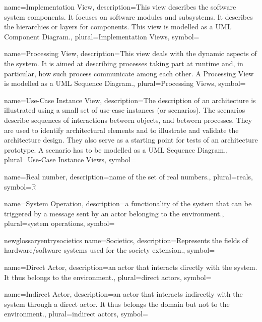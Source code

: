 {name={Implementation View},
description={This view describes the software system components. It focuses on
software modules and subsystems. It describes the hierarchies or layers for
components. This view is modelled as a UML Component Diagram.},
plural={Implementation Views}, 
symbol={}
}


{name={Processing View},
description={This view deals with the dynamic aspects of the system. It is
aimed at describing processes taking part at runtime and, in particular, how
such process communicate among each other. A Processing View is modelled as a
UML Sequence Diagram.},
plural={Processing Views}, 
symbol={}
}


{name={Use-Case Instance View},
description={The description of an architecture is illustrated using a small set
of use-case instances (or scenarios). The scenarios describe sequences of
interactions between objects, and between processes. They are used to identify
architectural elements and to illustrate and validate the architecture design.
They also serve as a starting point for tests of an architecture prototype. A
scenario has to be modelled as a UML Sequence Diagram.}, 
plural={Use-Case Instance Views}, 
symbol={}
}

{name={Real number},
description={name of the set of real numbers.},
plural={reals},
symbol={\ensuremath{\mathbb{R}}}
}

{name={System Operation},
description={a functionality of the system that can be triggered by a message
sent by an actor belonging to the environment.}, plural={system operations},
symbol={}
}

newglossaryentry{societics}
{name={Societics},
description={Represents the fields of hardware/software
systems used for the society extension.}, 
symbol={}
}

{name={Direct Actor},
description={an actor that interacts directly with the system. It thus belongs
to the environment.},
plural={direct actors},
symbol={}
}

{name={Indirect Actor},
description={an actor that interacts indirectly with the system through a direct
actor.  It thus belongs the domain but not to the environment.}, 
plural={indirect actors},
symbol={}
}

